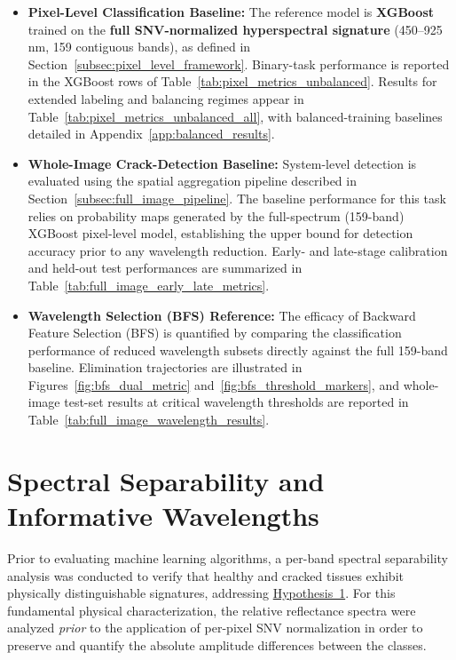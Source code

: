 \begin{itemize}
    \item \textbf{Pixel-Level Classification Baseline:} The reference model is \textbf{XGBoost} trained on the \textbf{full SNV-normalized hyperspectral signature} (450--925\,nm, 159 contiguous bands), as defined in Section~\ref{subsec:pixel_level_framework}. Binary-task performance is reported in the XGBoost rows of Table~\ref{tab:pixel_metrics_unbalanced}. Results for extended labeling and balancing regimes appear in Table~\ref{tab:pixel_metrics_unbalanced_all}, with balanced-training baselines detailed in Appendix~\ref{app:balanced_results}.
    
    \item \textbf{Whole-Image Crack-Detection Baseline:} System-level detection is evaluated using the spatial aggregation pipeline described in Section~\ref{subsec:full_image_pipeline}. The baseline performance for this task relies on probability maps generated by the full-spectrum (159-band) XGBoost pixel-level model, establishing the upper bound for detection accuracy prior to any wavelength reduction. Early- and late-stage calibration and held-out test performances are summarized in Table~\ref{tab:full_image_early_late_metrics}.
    
    \item \textbf{Wavelength Selection (BFS) Reference:} The efficacy of Backward Feature Selection (BFS) is quantified by comparing the classification performance of reduced wavelength subsets directly against the full 159-band baseline. Elimination trajectories are illustrated in Figures~\ref{fig:bfs_dual_metric} and~\ref{fig:bfs_threshold_markers}, and whole-image test-set results at critical wavelength thresholds are reported in Table~\ref{tab:full_image_wavelength_results}.
\end{itemize}

\newpage
\section{Spectral Separability and Informative Wavelengths}
\label{sec:spectral-characterization}

\noindent
Prior to evaluating machine learning algorithms, a per-band spectral separability analysis was conducted to verify that healthy and cracked tissues exhibit physically distinguishable signatures, addressing \hyperref[hyp:spectral_distinguishability]{Hypothesis~1}. For this fundamental physical characterization, the relative reflectance spectra were analyzed \textit{prior} to the application of per-pixel SNV normalization in order to preserve and quantify the absolute amplitude differences between the classes.

